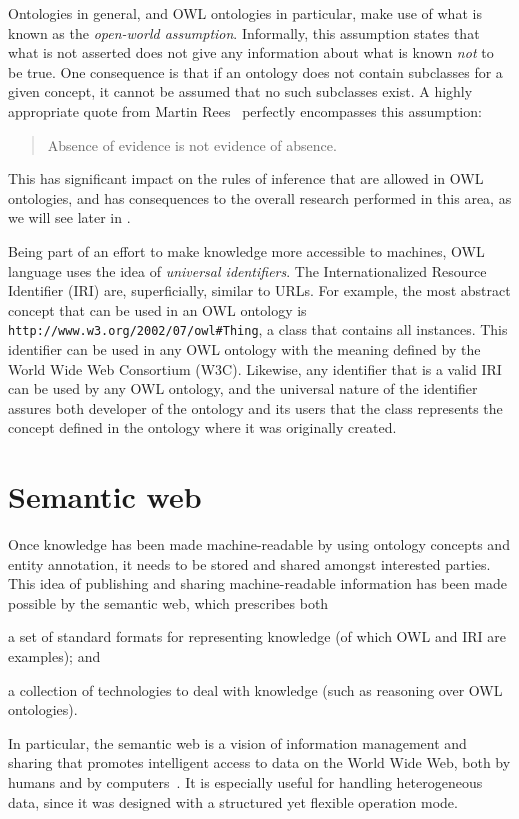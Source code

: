 Ontologies in general, and OWL ontologies in particular, make use of what is known as the \emph{open-world assumption}. Informally, this assumption states that what is not asserted does not give any information about what is known \emph{not} to be true. One consequence is that if an ontology does not contain subclasses for a given concept, it cannot be assumed that no such subclasses exist. A highly appropriate quote from Martin Rees~\citep{Oliver1971,Berendzen1973} perfectly encompasses this assumption:
\begin{quote}
    Absence of evidence is not evidence of absence.
\end{quote}
This has significant impact on the rules of inference that are allowed in OWL ontologies, and has consequences to the overall research performed in this area, as we will see later in .

Being part of an effort to make knowledge more accessible to machines, OWL language uses the idea of \emph{universal identifiers}. The Internationalized Resource Identifier (IRI) are, superficially, similar to URLs. For example, the most abstract concept that can be used in an OWL ontology is \nolinkurl{http://www.w3.org/2002/07/owl\#Thing}, a class that contains all instances. This identifier can be used in any OWL ontology with the meaning defined by the World Wide Web Consortium (W3C). Likewise, any identifier that is a valid IRI can be used by any OWL ontology, and the universal nature of the identifier assures both developer of the ontology and its users that the class represents the concept defined in the ontology where it was originally created.


\section{Semantic web} \label{sec:concepts/semantic-web}

Once knowledge has been made machine-readable by using ontology concepts and entity annotation, it needs to be stored and shared amongst interested parties. This idea of publishing and sharing machine-readable information has been made possible by the semantic web, which prescribes both
\begin{paralist}
    \item a set of standard formats for representing knowledge (of which OWL and IRI are examples); and
    \item a collection of technologies to deal with knowledge (such as reasoning over OWL ontologies).
\end{paralist}
In particular, the semantic web is a vision of information management and sharing that promotes intelligent access to data on the World Wide Web, both by humans and by computers~\citep{Berners-Lee2001,Shadbolt2006}. It is especially useful for handling heterogeneous data, since it was designed with a structured yet flexible operation mode.

